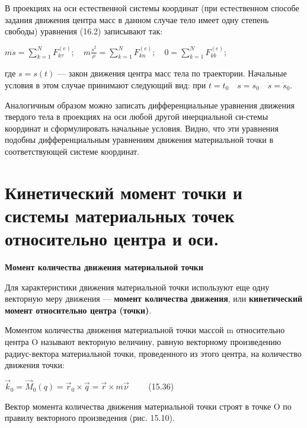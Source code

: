 {\begin{center}
    \par В проекциях на оси естественной системы координат (при естественном способе задания движения центра масс в данном случае тело имеет одну степень свободы) уравнения (16.2) записывают так:

    \par $m \ddot{s} = \sum\limits_{k=1}^N F_{k\tau}^{(e)}; \quad
    m \frac{\dot{s}^{2}}{\rho} = \sum\limits_{k=1}^N  F_{kn}^{(e)}; \quad 
    0 = \sum\limits_{k=1}^N F_{kb}^{(e)};$

    \par где  $s=s(t)$ — закон движения центра масс тела по траектории. Начальные условия в этом случае принимают следующий вид: при $t=t_0 \quad s=s_0 \quad \dot{s} = \dot{s}_{0}.$

    \par Аналогичным  образом  можно  записать  дифференциальные  уравнения движения твердого тела в проекциях на оси любой другой инерциальной си-стемы координат и сформулировать начальные условия. Видно, что эти уравнения  подобны  дифференциальным  уравнениям  движения  материальной точки в соответствующей системе координат.
    
\end{center}
\section{Кинетический момент точки и системы материальных точек относительно центра и оси.}
\begin{center}
    \par \textbf{Момент количества движения материальной точки} 
    
    \par Для характеристики движения материальной точки используют еще одну векторную меру движения — \textbf{момент количества движения}, или \textbf{кинетический момент относительно центра (точки)}.

    \par Моментом количества  движения материальной точки  массой m относительно центра O называют векторную величину, равную векторному произведению радиус-вектора материальной точки, проведенного из этого центра, на количество движения точки:
    
    \par $\vec{k}_0=\vec{M}_0(q)=\vec{r}_0 \times \vec{q} = 
    \vec{r} \times m\vec{\nu}\qquad$ (15.36)

    \par Вектор момента количества движения материальной точки строят в точке O по правилу векторного произведения (рис. 15.10).


\end{center}}
